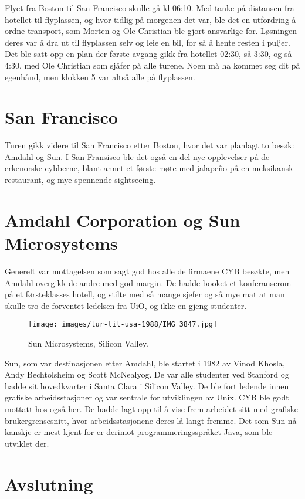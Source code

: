 Flyet fra Boston til San Francisco skulle gå kl 06:10. Med tanke på distansen fra hotellet til flyplassen, og hvor tidlig på morgenen det var, ble det en utfordring å ordne transport, som Morten og Ole Christian ble gjort ansvarlige for. Løsningen deres var å dra ut til flyplassen selv og leie en bil, for så å hente resten i puljer. Det ble satt opp en plan der første avgang gikk fra hotellet 02:30, så 3:30, og så 4:30, med Ole Christian som sjåfør på alle turene. Noen må ha kommet seg dit på egenhånd, men klokken 5 var altså alle på flyplassen.

\section{San Francisco}

Turen gikk videre til San Francisco etter Boston, hvor det var planlagt to besøk: Amdahl og Sun. I San Fransisco ble det også en del nye opplevelser på de erkenorske cybberne, blant annet et første møte med jalapeño på en meksikansk restaurant, og mye spennende sightseeing. 

\section{Amdahl Corporation og Sun Microsystems}

Generelt var mottagelsen som sagt god hos alle de firmaene CYB besøkte, men Amdahl overgikk de andre med god margin. De hadde booket et konferanserom på et førsteklasses hotell, og stilte med så mange sjefer og så mye mat at man skulle tro de forventet ledelsen fra UiO, og ikke en gjeng studenter.

\begin{figure}
	\texttt{[image: images/tur-til-usa-1988/IMG\_3847.jpg]}
	\caption{Sun Microsystems, Silicon Valley.}
\end{figure}

Sun, som var destinasjonen etter Amdahl, ble startet i 1982 av Vinod Khosla, Andy Bechtolsheim og Scott McNealyog. De var alle studenter ved Stanford og hadde sit hovedkvarter i Santa Clara i Silicon Valley. De ble fort ledende innen grafiske arbeidsstasjoner og var sentrale for utviklingen av Unix. CYB ble godt mottatt hos også her. De hadde lagt opp til å vise frem arbeidet sitt med grafiske brukergrensesnitt, hvor arbeidsstasjonene deres lå langt fremme. Det som Sun nå kanskje er mest kjent for er derimot programmeringsspråket Java, som ble utviklet der.

\section{Avslutning}

